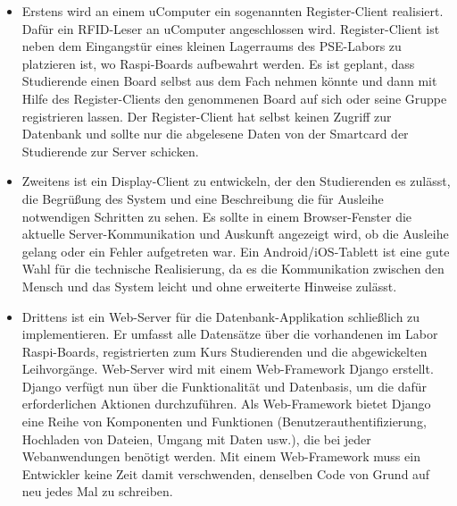 \begin{itemize}
\item Erstens wird an einem uComputer ein sogenannten Register-Client realisiert. Dafür ein RFID-Leser an uComputer angeschlossen wird. Register-Client ist neben dem Eingangstür eines kleinen Lagerraums des PSE-Labors zu platzieren ist, wo Raspi-Boards aufbewahrt werden. Es ist geplant, dass Studierende einen Board selbst aus dem Fach nehmen könnte und dann mit Hilfe des Register-Clients den genommenen Board auf sich oder seine Gruppe registrieren lassen. Der Register-Client hat selbst keinen Zugriff zur Datenbank und sollte nur die abgelesene Daten von der Smartcard der Studierende zur Server schicken. 
\item Zweitens ist ein Display-Client zu entwickeln, der den Studierenden es zulässt, die Begrüßung des System und eine Beschreibung die für Ausleihe notwendigen Schritten zu sehen. Es sollte in einem Browser-Fenster die aktuelle Server-Kommunikation und Auskunft angezeigt wird, ob die Ausleihe gelang oder ein Fehler aufgetreten war. Ein Android/iOS-Tablett ist eine gute Wahl für die technische Realisierung, da es die Kommunikation zwischen den Mensch und das System leicht und ohne erweiterte Hinweise zulässt. 
\item Drittens ist ein Web-Server für die Datenbank-Applikation schließlich zu implementieren. Er umfasst alle Datensätze über die vorhandenen im Labor Raspi-Boards, registrierten zum Kurs Studierenden und die abgewickelten Leihvorgänge.  Web-Server wird mit einem Web-Framework Django erstellt. Django verfügt nun über die Funktionalität und Datenbasis, um die dafür erforderlichen Aktionen durchzuführen. Als Web-Framework bietet Django eine Reihe von Komponenten und Funktionen (Benutzerauthentifizierung, Hochladen von Dateien, Umgang mit Daten usw.), die bei jeder Webanwendungen benötigt werden. Mit einem Web-Framework muss ein Entwickler keine Zeit damit verschwenden, denselben Code von Grund auf neu jedes Mal zu schreiben.
\end{itemize}


